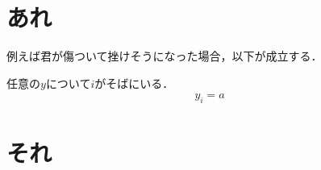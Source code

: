 \documentclass[dvipdfmx]{bxjsarticle}
\begin{document}
\section{あれ}
例えば君が傷ついて挫けそうになった場合，以下が成立する．
\begin{theo}
任意の$y$について$i$がそばにいる．
\begin{align}
y_i=a
\end{align}
\end{theo}

\section{それ}
\end{document}
